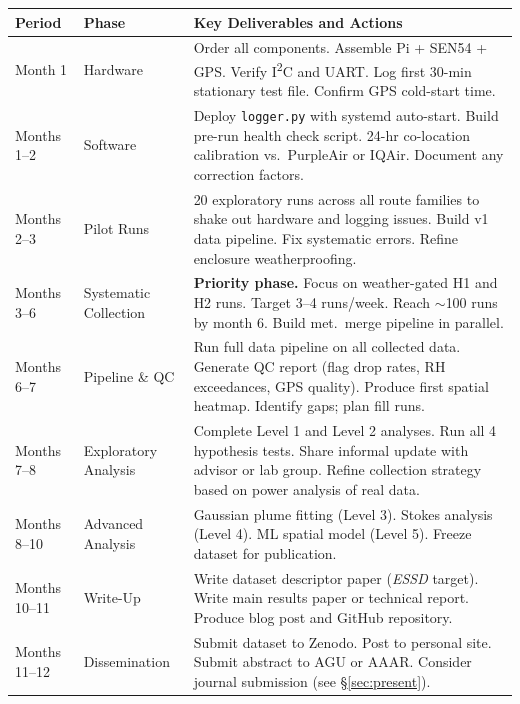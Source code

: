 \documentclass[11pt, letterpaper]{article}
\begin{document}
\medskip
\begin{center}
\begin{tabular}{L{2.0cm} L{2.4cm} L{9.0cm}}
\toprule
{}
\color{white}\textbf{Period} &
\color{white}\textbf{Phase} &
\color{white}\textbf{Key Deliverables and Actions} \\
\midrule
Month 1 &
Hardware &
Order all components. Assemble Pi + SEN54 + GPS. Verify I\textsuperscript{2}C and UART. Log first 30-min stationary test file. Confirm GPS cold-start time. \\
Months 1--2 &
Software &
Deploy \texttt{logger.py} with systemd auto-start. Build pre-run health check script. 24-hr co-location calibration vs.\ PurpleAir or IQAir. Document any correction factors. \\
Months 2--3 &
Pilot Runs &
20 exploratory runs across all route families to shake out hardware and logging issues. Build v1 data pipeline. Fix systematic errors. Refine enclosure weatherproofing. \\
Months 3--6 &
Systematic Collection &
\textbf{Priority phase.} Focus on weather-gated H1 and H2 runs. Target 3--4 runs/week. Reach $\sim$100 runs by month 6. Build met.\ merge pipeline in parallel. \\
Months 6--7 &
Pipeline \& QC &
Run full data pipeline on all collected data. Generate QC report (flag drop rates, RH exceedances, GPS quality). Produce first spatial heatmap. Identify gaps; plan fill runs. \\
Months 7--8 &
Exploratory Analysis &
Complete Level 1 and Level 2 analyses. Run all 4 hypothesis tests. Share informal update with advisor or lab group. Refine collection strategy based on power analysis of real data. \\
Months 8--10 &
Advanced Analysis &
Gaussian plume fitting (Level 3). Stokes analysis (Level 4). ML spatial model (Level 5). Freeze dataset for publication. \\
Months 10--11 &
Write-Up &
Write dataset descriptor paper (\textit{ESSD} target). Write main results paper or technical report. Produce blog post and GitHub repository. \\
Months 11--12 &
Dissemination &
Submit dataset to Zenodo. Post to personal site. Submit abstract to AGU or AAAR. Consider journal submission (see \S\ref{sec:present}). \\
\bottomrule
\end{tabular}
\end{center}
\end{document}
